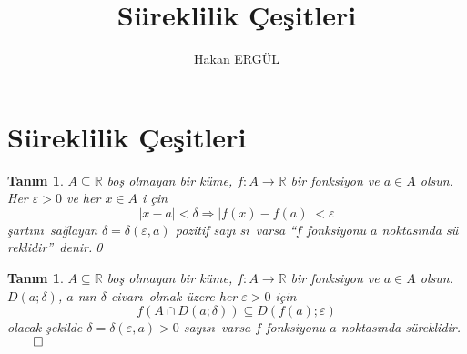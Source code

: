 \documentclass[12pt]{article}
\newtheorem{definition}[theorem]{Tan\i m}
\begin{document}
\title{S\"{u}reklilik \c{C}e\c{s}itleri}
\author{Hakan ERG\"{U}L}

\section{S\"{u}reklilik \c{C}e\c{s}itleri}

\begin{definition}
$A\subseteq 
\mathbb{R}
$ bo\c{s} olmayan bir k\"{u}me, $f:A\rightarrow 
\mathbb{R}
$ bir fonksiyon ve $a\in A$ olsun. Her $\varepsilon >0$ ve her $x\in A$ i%
\c{c}in%
\[
\left\vert x-a\right\vert <\delta \Rightarrow \left\vert
f(x)-f(a)\right\vert <\varepsilon 
\]%
\c{s}art\i n\i\ sa\u{g}layan $\delta =\delta (\varepsilon ,a)$ pozitif say\i
s\i\ varsa \textquotedblleft $f$ fonksiyonu $a$ noktas\i nda s\"{u}%
reklidir\textquotedblright\ denir.\qed
\end{definition}

\begin{definition}
$A\subseteq 
\mathbb{R}
$ bo\c{s} olmayan bir k\"{u}me, $f:A\rightarrow 
\mathbb{R}
$ bir fonksiyon ve $a\in A$ olsun. $D(a;\delta )$, $a$ n\i n $\delta $
civar\i\ olmak \"{u}zere her $\varepsilon >0$ i\c{c}in 
\[
f(A\cap D(a;\delta ))\subseteq D(f(a);\varepsilon )
\]%
olacak \c{s}ekilde $\delta =\delta (\varepsilon ,a)>0$ say\i s\i\ varsa $f$
fonksiyonu $a$ noktas\i nda s\"{u}reklidir.$\qed$
\end{definition}
\end{document}
